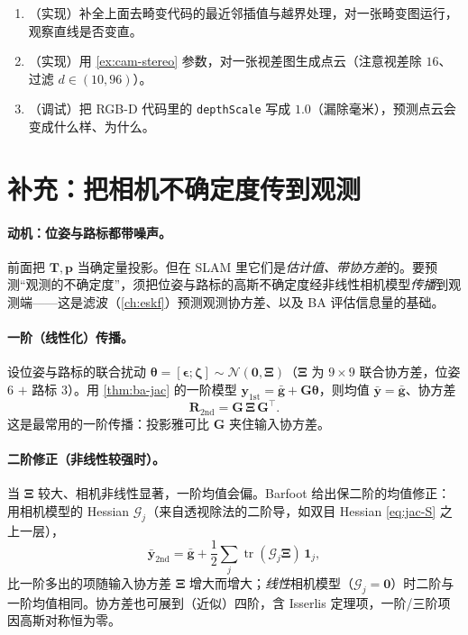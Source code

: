 \begin{practice}
\begin{enumerate}
  \item （实现）补全上面去畸变代码的最近邻插值与越界处理，对一张畸变图运行，观察直线是否变直。
  \item （实现）用 \cref{ex:cam-stereo} 参数，对一张视差图生成点云（注意视差除 $16$、过滤 $d\in(10,96)$）。
  \item （调试）把 RGB-D 代码里的 \texttt{depthScale} 写成 $1.0$（漏除毫米），预测点云会变成什么样、为什么。
\end{enumerate}
\end{practice}

\section{补充：把相机不确定度传到观测}
\label{sec:cam-uncertainty}

\paragraph{动机：位姿与路标都带噪声。}
前面把 $\mathbf{T},\mathbf{p}$ 当确定量投影。但在 SLAM 里它们是\emph{估计值、带协方差}的。要预测“观测的不确定度”，须把位姿与路标的高斯不确定度经非线性相机模型\emph{传播}到观测端\cite{barfoot2024state}——这是滤波（\cref{ch:eskf}）预测观测协方差、以及 BA 评估信息量的基础。

\paragraph{一阶（线性化）传播。}
设位姿与路标的联合扰动 $\boldsymbol\theta=[\boldsymbol\epsilon;\boldsymbol\zeta]\sim\mathcal{N}(\mathbf{0},\boldsymbol\Xi)$（$\boldsymbol\Xi$ 为 $9\times9$ 联合协方差，位姿 $6$ $+$ 路标 $3$）。用 \cref{thm:ba-jac} 的一阶模型 $\mathbf{y}_{1\text{st}}=\bar{\mathbf{g}}+\mathbf{G}\boldsymbol\theta$，则均值 $\bar{\mathbf{y}}=\bar{\mathbf{g}}$、协方差
\begin{equation}
  \mathbf{R}_{2\text{nd}}=\mathbf{G}\,\boldsymbol\Xi\,\mathbf{G}^\top.
  \label{eq:unc-first}
\end{equation}
这是最常用的一阶传播：投影雅可比 $\mathbf{G}$ 夹住输入协方差。

\paragraph{二阶修正（非线性较强时）。}
当 $\boldsymbol\Xi$ 较大、相机非线性显著，一阶均值会偏。Barfoot\cite{barfoot2024state} 给出保二阶的均值修正：用相机模型的 Hessian $\boldsymbol{\mathcal{G}}_j$（来自透视除法的二阶导，如双目 Hessian \cref{eq:jac-S} 之上一层），
\begin{equation}
  \bar{\mathbf{y}}_{2\text{nd}}=\bar{\mathbf{g}}+\frac12\sum_j\operatorname{tr}(\boldsymbol{\mathcal{G}}_j\boldsymbol\Xi)\,\mathbf{1}_j,
  \label{eq:unc-second}
\end{equation}
比一阶多出的项随输入协方差 $\boldsymbol\Xi$ 增大而增大；\emph{线性}相机模型（$\boldsymbol{\mathcal{G}}_j=\mathbf{0}$）时二阶与一阶均值相同。协方差也可展到（近似）四阶，含 Isserlis 定理项，一阶/三阶项因高斯对称恒为零\cite{barfoot2024state}。

